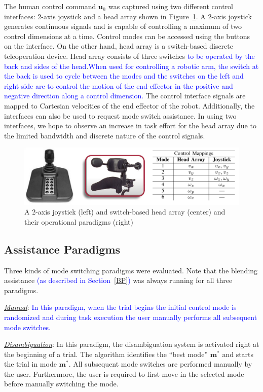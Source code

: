 \documentclass[conference]{IEEEtran}
\begin{document}
 The human control command $\boldsymbol{u}_h$ was captured using two different control interfaces: 2-axis joystick and a head array shown in Figure~\ref{J2_HA}. 
 A 2-axis joystick generates continuous signals and is capable of controlling a maximum of two control dimensions at a time. Control modes can be accessed using the buttons on the interface. 
 On the other hand, head array  is a switch-based discrete teleoperation device. Head array consists of three switches \textcolor{blue}{to be operated by the back and sides of the head}.\textcolor{blue}{When used for controlling a robotic arm, the switch at the back is used to cycle between the modes and the switches on the left and right side are to control the motion of the end-effector in the positive and negative direction along a control dimension.}
 The control interface signals are mapped to Cartesian velocities of the end effector of the robot. Additionally, the interfaces can also be used to request mode switch assistance. In using two interfaces, we hope to observe an increase in task effort for the head array due to the limited bandwidth and discrete nature of the control signals.
   \begin{figure}[h]
 	\centering
 	\includegraphics[width = 0.9\hsize, height = 0.16\vsize]{./figures/INTER.png}
 	\caption{A 2-axis joystick (left) and switch-based head array (center) and their operational paradigms (right)}
 	\label{J2_HA}
 \end{figure}
 \subsection{Assistance Paradigms}
 Three kinds of mode switching paradigms were evaluated. Note that the blending assistance \textcolor{blue}{(as described in Section~\ref{BP})} was always running for all three paradigms.
 
 \noindent\underline{\textit{Manual}}: \textcolor{blue}{In this paradigm, when the trial begins the initial control mode is randomized and during task execution the user manually performs all subsequent mode switches.}
 
 \noindent\underline{\textit{Disambiguation}}: In this paradigm, the disambiguation system is activated right at the beginning of a trial. The algorithm identifies the ``best mode'' $\boldsymbol{m}^*$ and starts the trial in mode $\boldsymbol{m}^*$. All subsequent mode switches are performed manually by the user. Furthermore, the user is required to first move in the selected mode before manually switching the mode. 
 
\end{document}
